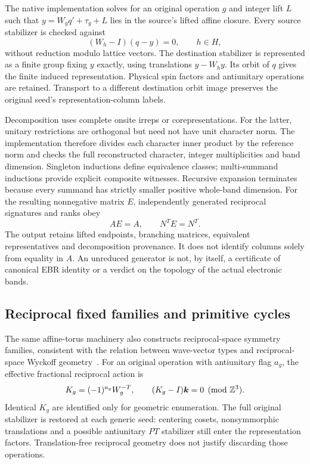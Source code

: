 The native implementation solves for an original operation $g$ and
integer lift $L$ such that $y=W_gq'+\tau_g+L$ lies in the source's
lifted affine closure. Every source stabilizer is checked against
\begin{equation}
 (W_h-I)(q-y)=0,\qquad h\in H,
 \label{eq:site-path-stabilizer}
\end{equation}
without reduction modulo lattice vectors. The destination stabilizer
is represented as a finite group fixing $y$ exactly, using translations
$y-W_hy$. Its orbit of $q$ gives the finite induced representation.
Physical spin factors and antiunitary operations are retained.
Transport to a different destination orbit image preserves the
original seed's representation-column labels.

Decomposition uses complete onsite irreps or corepresentations.
For the latter, unitary restrictions are orthogonal but need not
have unit character norm. The implementation therefore divides each
character inner product by the reference norm and checks the full
reconstructed character, integer multiplicities and band dimension.
Singleton inductions define equivalence classes; multi-summand
inductions provide explicit composite witnesses. Recursive expansion
terminates because every summand has strictly smaller positive
whole-band dimension. For the resulting nonnegative matrix $E$,
independently generated reciprocal signatures and ranks obey
\begin{equation}
 AE=A,\qquad N^TE=N^T.
 \label{eq:site-expansion-check}
\end{equation}
The output retains lifted endpoints, branching matrices, equivalent
representatives and decomposition provenance. It does not identify
columns solely from equality in $A$. An unreduced generator is not,
by itself, a certificate of canonical EBR identity or a verdict on
the topology of the actual electronic bands.

\subsection{Reciprocal fixed families and primitive cycles}
The same affine-torus machinery also constructs reciprocal-space
symmetry families, consistent with the relation between wave-vector
types and reciprocal-space Wyckoff geometry~\cite{BilbaoReciprocal}.
For an original operation with antiunitary flag $a_g$, the effective
fractional reciprocal action is
\begin{equation}
 K_g=(-1)^{a_g}W_g^{-T},\qquad
 (K_g-I)\bm{k}=0\pmod{\mathbb Z^3}.
\end{equation}
Identical $K_g$ are identified only for geometric enumeration. The
full original stabilizer is restored at each generic seed: centering
cosets, nonsymmorphic translations and a possible antiunitary $PT$
stabilizer still enter the representation factors. Translation-free
reciprocal geometry does not justify discarding those operations.

